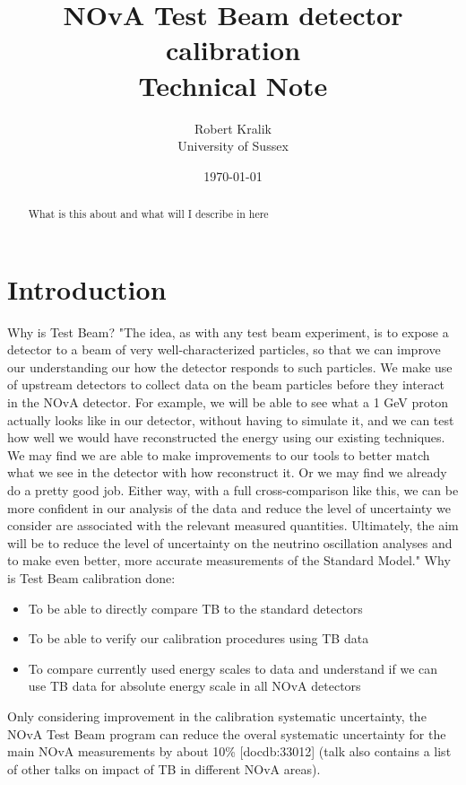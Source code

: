 \documentclass[12pt,a4paper]{article}
\author{Robert Kralik\\\small{University of Sussex}}
\title{NOvA Test Beam detector calibration\\ \vspace*{5mm}
\Large{Technical Note}}
\date{\today}
\begin{document}
\maketitle
\begin{abstract}
What is this about and what will I describe in here
\end{abstract}
\tableofcontents
\newpage

\section{Introduction}
Why is Test Beam?
"The idea, as with any test beam experiment, is to expose a detector to a beam of very well-characterized particles, so that we can improve our understanding our how the detector responds to such particles. We make use of upstream detectors to collect data on the beam particles before they interact in the NOvA detector. For example, we will be able to see what a 1 GeV proton actually looks like in our detector, without having to simulate it, and we can test how well we would have reconstructed the energy using our existing techniques. We may find we are able to make improvements to our tools to better match what we see in the detector with how reconstruct it. Or we may find we already do a pretty good job. Either way, with a full cross-comparison like this, we can be more confident in our analysis of the data and reduce the level of uncertainty we consider are associated with the relevant measured quantities. Ultimately, the aim will be to reduce the level of uncertainty on the neutrino oscillation analyses and to make even better, more accurate measurements of the Standard Model."%
Why is Test Beam calibration done:
\begin{itemize}
\item To be able to directly compare TB to the standard detectors
\item To be able to verify our calibration procedures using TB data
\item To compare currently used energy scales to data and understand if we can use TB data for absolute energy scale in all NOvA detectors
\end{itemize}

Only considering improvement in the calibration systematic uncertainty, the NOvA Test Beam program can reduce the overal systematic uncertainty for the main NOvA measurements by about 10\% [docdb:33012] (talk also contains a list of other talks on impact of TB in different NOvA areas).
\end{document}
